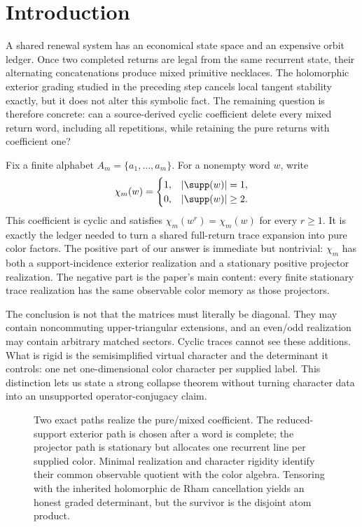 \section{Introduction}
\label{sec:introduction}

A shared renewal system has an economical state space and an expensive orbit
ledger.  Once two completed returns are legal from the same recurrent state,
their alternating concatenations produce mixed primitive necklaces.  The
holomorphic exterior grading studied in the preceding step cancels local
tangent stability exactly, but it does not alter this symbolic fact.  The
remaining question is therefore concrete: can a source-derived cyclic
coefficient delete every mixed return word, including all repetitions, while
retaining the pure returns with coefficient one?

Fix a finite alphabet \(A_m=\{a_1,\ldots,a_m\}\).  For a nonempty word \(w\),
write
\begin{equation}
 \chi_m(w)=
 \begin{cases}
  1,&|\supp(w)|=1,\\
  0,&|\supp(w)|\ge2.
 \end{cases}
 \label{eq:intro-selector}
\end{equation}
This coefficient is cyclic and satisfies
\(\chi_m(w^r)=\chi_m(w)\) for every \(r\ge1\).  It is exactly the ledger needed
to turn a shared full-return trace expansion into pure color factors.  The
positive part of our answer is immediate but nontrivial: 
\(\chi_m\) has both a support-incidence exterior realization and a stationary
positive projector realization.  The negative part is the paper's main
content: every finite stationary trace realization has the same observable
color memory as those projectors.

The conclusion is not that the matrices must literally be diagonal.  They
may contain noncommuting upper-triangular extensions, and an even/odd
realization may contain arbitrary matched sectors.  Cyclic traces cannot see
these additions.  What is rigid is the semisimplified virtual character and
the determinant it controls: one net one-dimensional color character per
supplied label.  This distinction lets us state a strong collapse theorem
without turning character data into an unsupported operator-conjugacy claim.

\begin{figure}[t]
  \centering
  \resizebox{0.98\textwidth}{!}{}
  \caption{Two exact paths realize the pure/mixed coefficient.  The
  reduced-support exterior path is chosen after a word is complete; the
  projector path is stationary but allocates one recurrent line per supplied
  color.  Minimal realization and character rigidity identify their common
  observable quotient with the color algebra.  Tensoring with the inherited
  holomorphic de Rham cancellation yields an honest graded determinant, but
  the survivor is the disjoint atom product.}
  \label{fig:selector-collapse}
\end{figure}

